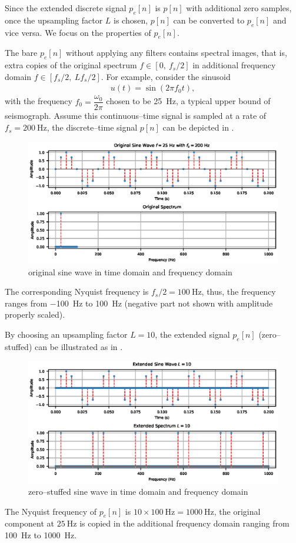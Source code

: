 Since the extended discrete signal $p_e[n]$ is $p[n]$ with additional zero samples, once the upsampling factor $L$ is chosen, $p[n]$ can be converted to $p_e[n]$ and vice versa. We focus on the properties of $p_e[n]$.

The bare $p_e[n]$ without applying any filters contains spectral images, that is, extra copies of the original spectrum $f\in[0,~f_s/2]$ in additional frequency domain $f\in[f_s/2,~Lf_s/2]$. For example, consider the sinusoid
\begin{gather}
u(t)=\sin\left(2\pi{}f_0t\right),
\end{gather}
with the frequency $f_0=\dfrac{\omega_0}{2\pi}$ chosen to be \SI{25}{\hertz}, a typical upper bound of seismograph. Assume this continuous--time signal is sampled at a rate of $f_s=\SI{200}{\hertz}$, the discrete--time signal $p[n]$ can be depicted in .
\begin{figure}[htb!]
\centering
\includegraphics{PIC/PureSineOrigin}
\caption{original sine wave in time domain and frequency domain}\label{fig:original}
\end{figure}
The corresponding Nyquist frequency is $f_s/2=\SI{100}{\hertz}$, thus, the frequency ranges from \SI{-100}{\hertz} to \SI{100}{\hertz} (negative part not shown with amplitude properly scaled).

By choosing an upsampling factor $L=10$, the extended signal $p_e[n]$ (zero--stuffed) can be illustrated as in .
\begin{figure}[htb!]
\centering
\includegraphics{PIC/PureSineExtended}
\caption{zero--stuffed sine wave in time domain and frequency domain}\label{fig:extended}
\end{figure}
The Nyquist frequency of $p_e[n]$ is $10\times\SI{100}{\hertz}=\SI{1000}{\hertz}$, the original component at $\SI{25}{\hertz}$ is copied in the additional frequency domain ranging from \SI{100}{\hertz} to \SI{1000}{\hertz}.

